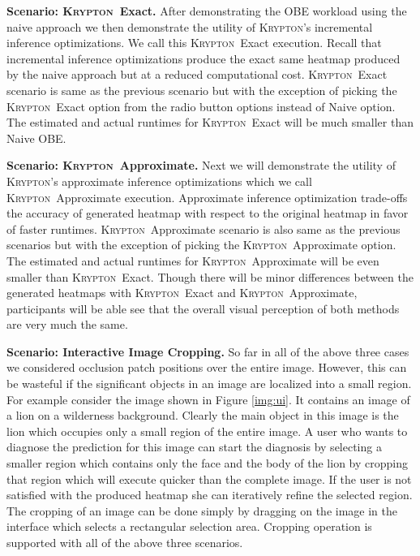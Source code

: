 \documentclass{vldb}
\newcommand{\system}{\textsc{Krypton}}
\begin{document}
\vspace{2mm}
\noindent \textbf{Scenario: \system~Exact.} After demonstrating the OBE workload using the naive approach we then demonstrate the utility of \system's incremental inference optimizations. We call this \system~Exact execution.
Recall that incremental inference optimizations produce the exact same heatmap produced by the naive approach but at a reduced computational cost.
\system~Exact scenario is same as the previous scenario but with the exception of picking the \system~Exact option from the radio button options instead of Naive option.
The estimated and actual runtimes for \system~Exact will be much smaller than Naive OBE.

\vspace{2mm}
\noindent \textbf{Scenario: \system~Approximate.} Next we will demonstrate the utility of \system's approximate inference optimizations which we call \system~Approximate execution.
Approximate inference optimization trade-offs the accuracy of generated heatmap with respect to the original heatmap in favor of faster runtimes.
\system~Approximate scenario is also same as the previous scenarios but with the exception of picking the \system~Approximate option.
The estimated and actual runtimes for \system~Approximate will be even smaller than \system~Exact.
Though there will be minor differences between the generated heatmaps with \system~Exact and \system~Approximate, participants will be able see that the overall visual perception of both methods are very much the same.

\vspace{2mm}
\noindent \textbf{Scenario: Interactive Image Cropping.} So far in all of the above three cases we considered occlusion patch positions over the entire image.
However, this can be wasteful if the significant objects in an image are localized into a small region.
For example consider the image shown in Figure \ref{img:ui}.
It contains an image of a lion on a wilderness background.
Clearly the main object in this image is the lion which occupies only a small region of the entire image.
A user who wants to diagnose the prediction for this image can start the diagnosis by selecting a smaller region which contains only the face and the body of the lion by cropping that region which will execute quicker than the complete image.
If the user is not satisfied with the produced heatmap she can iteratively refine the selected region.
The cropping of an image can be done simply by dragging on the image in the interface which selects a rectangular selection area.
Cropping operation is supported with all of the above three scenarios.
\end{document}
